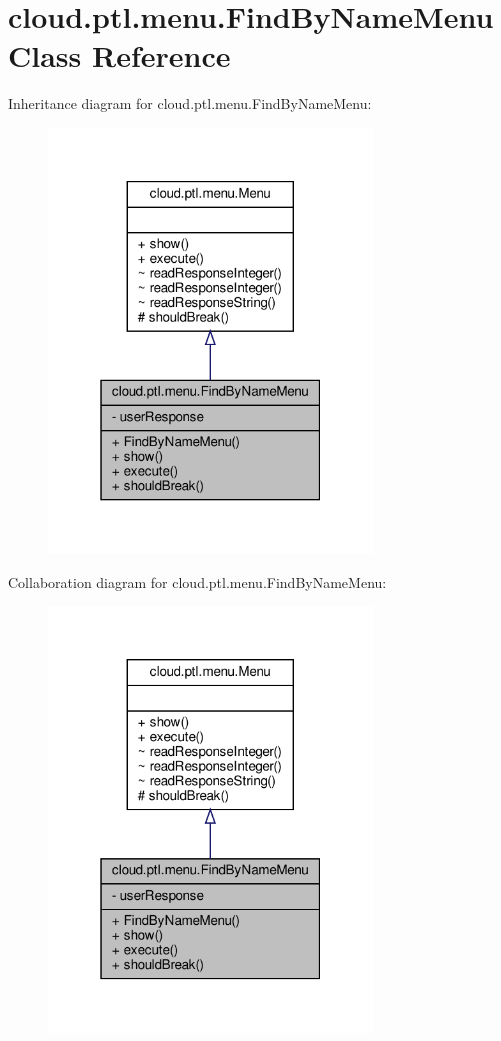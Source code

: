 \hypertarget{classcloud_1_1ptl_1_1menu_1_1FindByNameMenu}{}\section{cloud.\+ptl.\+menu.\+Find\+By\+Name\+Menu Class Reference}
\label{classcloud_1_1ptl_1_1menu_1_1FindByNameMenu}


Inheritance diagram for cloud.\+ptl.\+menu.\+Find\+By\+Name\+Menu\+:
\nopagebreak
\begin{figure}[H]
\begin{center}
\leavevmode
\includegraphics[width=244pt]{classcloud_1_1ptl_1_1menu_1_1FindByNameMenu__inherit__graph}
\end{center}
\end{figure}


Collaboration diagram for cloud.\+ptl.\+menu.\+Find\+By\+Name\+Menu\+:
\nopagebreak
\begin{figure}[H]
\begin{center}
\leavevmode
\includegraphics[width=244pt]{classcloud_1_1ptl_1_1menu_1_1FindByNameMenu__coll__graph}
\end{center}
\end{figure}
